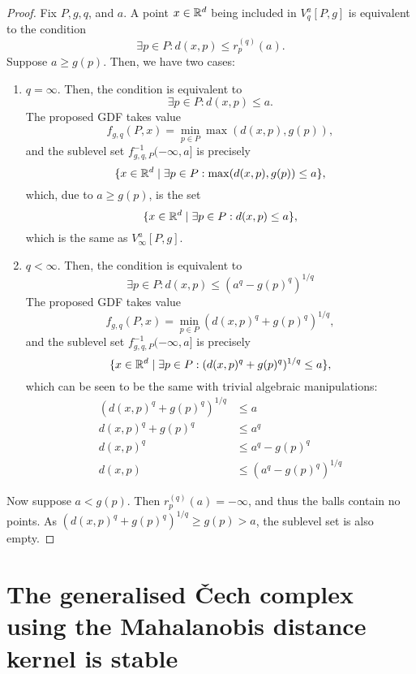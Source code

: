 \begin{proof}
    Fix $P, g, q$, and $a$. A point $x \in \mathbb{R}^d$ being included in $V^a_q[P, g]$
    is equivalent to the condition
    \begin{equation}
        \exists p \in P : d(x, p) \leq r_p^{(q)}(a).
    \end{equation}
    Suppose $a \geq g(p)$. Then, we have two cases:
    \begin{enumerate}
        \item $q = \infty$. Then, the condition is equivalent to
            \begin{equation}
                \exists p \in P : d(x, p) \leq a.
            \end{equation}
            The proposed GDF takes value
            \begin{equation}
                f_{g, q}(P, x) = \min_{p \in P} \max(d(x, p), g(p)),
            \end{equation}
            and the sublevel set $f^{-1}_{g, q, P}(-\infty, a]$ is precisely
            \begin{equation}
                \{x \in \mathbb{R}^d \mid \exists p \in P : \max(d(x, p), g(p)) \leq a\},
            \end{equation}
            which, due to $a \geq g(p)$, is the set
            \begin{equation}
                \{x \in \mathbb{R}^d \mid \exists p \in P : d(x, p) \leq a\},
            \end{equation}
            which is the same as $V^a_\infty[P, g]$.
        \item $q < \infty$. Then, the condition is equivalent to
            \begin{equation}
                \exists p \in P : d(x, p) \leq (a^q - g(p)^q)^{1/q}
            \end{equation}
            The proposed GDF takes value
            \begin{equation}
                f_{g, q}(P, x) = \min_{p \in P} (d(x, p)^q + g(p)^q)^{1/q},
            \end{equation}
            and the sublevel set $f^{-1}_{g, q, P}(-\infty, a]$ is precisely
            \begin{equation}
                \{x \in \mathbb{R}^d \mid \exists p \in P : (d(x, p)^q + g(p)^q)^{1/q} \leq a\},
            \end{equation}
            which can be seen to be the same with trivial algebraic manipulations:
            \begin{align}
                (d(x, p)^q + g(p)^q)^{1/q} & \leq a \\
                d(x, p)^q + g(p)^q & \leq a^q \\
                d(x, p)^q & \leq a^q - g(p)^q\\
                d(x, p) & \leq (a^q - g(p)^q)^{1 / q}
            \end{align}
    \end{enumerate}

    Now suppose $a < g(p)$. Then $r_p^{(q)}(a) = - \infty$, and thus the balls
    contain no points. As $(d(x, p)^q + g(p)^q)^{1/q} \geq g(p) > a$, the sublevel
    set is also empty.
\end{proof}

\chapter{The generalised \v{C}ech complex using the Mahalanobis distance kernel is stable}
\label{app:mahalanobis}
\todo{}
